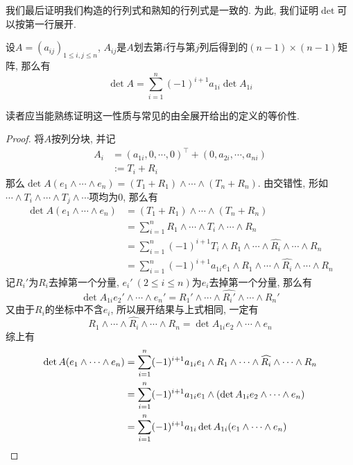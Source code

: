 我们最后证明我们构造的行列式和熟知的行列式是一致的.
为此, 我们证明$\det$可以按第一行展开.
\begin{prop}
    设$A=(a_{ij})_{1\leq i,j\leq n}$, $A_{ij}$是$A$划去第$i$行与第$j$列后得到的$(n-1)\times(n-1)$矩阵, 那么有
    \[\det{A}=\sum_{i=1}^n(-1)^{i+1}a_{1i}\det{A_{1i}}\]
\end{prop}
读者应当能熟练证明这一性质与常见的由全展开给出的定义的等价性.
\begin{proof}
    将$A$按列分块, 并记
    \begin{align*}
        A_i & =  (a_{1i},0,\cdots,0)^\top + (0,a_{2i},\cdots,a_{ni})\\
        & :=  T_i + R_i
    \end{align*}
    那么$\det{A}(e_1\wedge\cdots\wedge e_n)=(T_1+R_1)\wedge\cdots\wedge(T_n+R_n)$.
    由交错性, 形如$\cdots\wedge T_i\wedge\cdots\wedge T_j\wedge\cdots$项均为$0$, 那么有
    \begin{align*}
        \det{A}(e_1\wedge\cdots\wedge e_n)&=(T_1+R_1)\wedge\cdots\wedge(T_n+R_n)\\
        &=\sum_{i=1}^n R_1\wedge\cdots\wedge T_i\wedge\cdots\wedge R_n\\
        &=\sum_{i=1}^n (-1)^{i+1}T_i\wedge R_1\wedge\cdots\wedge\widehat{R_i}\wedge\cdots\wedge R_n\\
        &=\sum_{i=1}^n (-1)^{i+1}a_{1i}e_1\wedge R_1\wedge\cdots\wedge\widehat{R_i}\wedge\cdots\wedge R_n
    \end{align*}
    记$R_i'$为$R_i$去掉第一个分量, $e_i'\ (2\leq i\leq n)$为$e_i$去掉第一个分量, 那么有
    \[\det{A_{1i}}e_2'\wedge\cdots\wedge e_n'=R_1'\wedge\cdots\wedge\widehat{R_i'}\wedge\cdots\wedge R_n'\]
    又由于$R_i$的坐标中不含$e_i$, 所以展开结果与上式相同, 一定有
    \[R_1\wedge\cdots\wedge\widehat{R_i}\wedge\cdots\wedge R_n=\det{A_{1i}}e_2\wedge\cdots\wedge e_n\]
    综上有
    \begin{align*}
        \det{A}(e_1\wedge\cdots\wedge e_n)&=\sum_{i=1}^n (-1)^{i+1}a_{1i}e_1\wedge R_1\wedge\cdots\wedge\widehat{R_i}\wedge\cdots\wedge R_n\\
        &=\sum_{i=1}^n (-1)^{i+1}a_{1i}e_1\wedge(\det{A_{1i}}e_2\wedge\cdots\wedge e_n)\\
        &=\sum_{i=1}^n(-1)^{i+1}a_{1i}\det{A_{1i}}(e_1\wedge\cdots\wedge e_n)\qedhere
    \end{align*}
\end{proof}